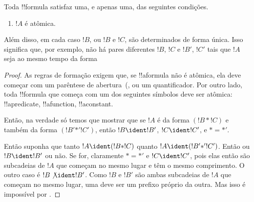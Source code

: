 \documentclass[../../../include/open-logic-section]{subfiles}
\begin{document}
\begin{prop}
Toda !!{formula} satisfaz uma, e apenas uma, das seguintes condições.
\begin{enumerate}
\item $!A$ é atômica.







\end{enumerate}
Além disso, em cada caso $!B$, ou $!B$ e $!C$, são determinados de forma
única.  Isso significa que, por exemplo, não há pares diferentes $!B$,
$!C$ e $!B'$, $!C'$ tais que $!A$ seja ao mesmo tempo da forma 
\end{prop}

\begin{proof}
As regras de formação exigem que, se !!a{formula} não é atômica, ela
deve começar com um parêntese de abertura~(, 
ou um quantificador. Por outro lado, toda !!{formula} que começa com
um dos seguintes símbolos deve ser atômica: !!a{predicate}, !!a{function}, !!a{constant}.

Então, na verdade só temos que mostrar que se $!A$ é da forma $(!B \ast
!C)$ e também da forma $(!B' \mathbin{\ast'} !C')$, então $!B \ident
!B'$, $!C \ident !C'$, e $\ast = {\ast'}$.

Então suponha que tanto $!A \ident (!B \ast !C)$ quanto $!A \ident (!B'
\mathbin{\ast'} !C')$.  Então ou $!B \ident !B'$ ou não.  Se for,
claramente $\ast = {\ast'}$ e $!C \ident !C'$, pois elas então são
subcadeias de $!A$ que começam no mesmo lugar e têm o mesmo
comprimento.  O outro caso é $!B \not\ident !B'$.  Como $!B$ e
$!B'$ são ambas subcadeias de $!A$ que começam no mesmo lugar, uma
deve ser um prefixo próprio da outra.  Mas isso é impossível por
.
\end{proof}
\end{document}
